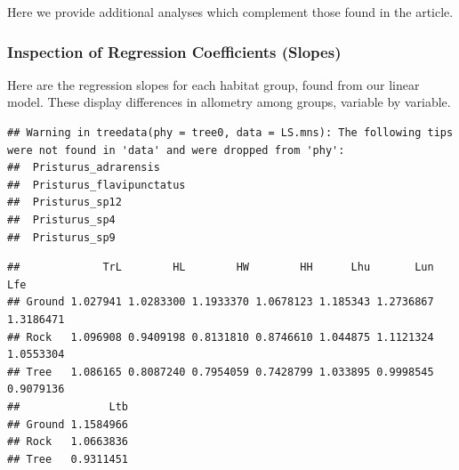 \documentclass[
  11pt,
]{article}
\newenvironment{Shaded}{\begin{snugshade}}{\end{snugshade}}
\newcommand{\AttributeTok}[1]{\textcolor[rgb]{0.77,0.63,0.00}{#1}}
\newcommand{\CommentTok}[1]{\textcolor[rgb]{0.56,0.35,0.01}{\textit{#1}}}
\newcommand{\DecValTok}[1]{\textcolor[rgb]{0.00,0.00,0.81}{#1}}
\newcommand{\FunctionTok}[1]{\textcolor[rgb]{0.00,0.00,0.00}{#1}}
\newcommand{\NormalTok}[1]{#1}
\newcommand{\OtherTok}[1]{\textcolor[rgb]{0.56,0.35,0.01}{#1}}
\newcommand{\SpecialCharTok}[1]{\textcolor[rgb]{0.00,0.00,0.00}{#1}}
\newcommand{\StringTok}[1]{\textcolor[rgb]{0.31,0.60,0.02}{#1}}
\begin{document}
Here we provide additional analyses which complement those found in the
article.

\hypertarget{inspection-of-regression-coefficients-slopes}{%
\subsubsection{Inspection of Regression Coefficients
(Slopes)}\label{inspection-of-regression-coefficients-slopes}}

Here are the regression slopes for each habitat group, found from our
linear model. These display differences in allometry among groups,
variable by variable.

\begin{verbatim}
## Warning in treedata(phy = tree0, data = LS.mns): The following tips were not found in 'data' and were dropped from 'phy':
##  Pristurus_adrarensis
##  Pristurus_flavipunctatus
##  Pristurus_sp12
##  Pristurus_sp4
##  Pristurus_sp9
\end{verbatim}

\begin{Shaded}
\end{Shaded}

\begin{verbatim}
##             TrL        HL        HW        HH      Lhu       Lun       Lfe
## Ground 1.027941 1.0283300 1.1933370 1.0678123 1.185343 1.2736867 1.3186471
## Rock   1.096908 0.9409198 0.8131810 0.8746610 1.044875 1.1121324 1.0553304
## Tree   1.086165 0.8087240 0.7954059 0.7428799 1.033895 0.9998545 0.9079136
##              Ltb
## Ground 1.1584966
## Rock   1.0663836
## Tree   0.9311451
\end{verbatim}
\end{document}
